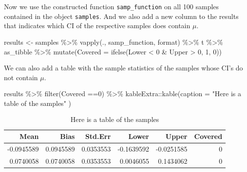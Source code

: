 \documentclass[
]{book}
\newenvironment{Shaded}{\begin{snugshade}}{\end{snugshade}}
\newcommand{\AttributeTok}[1]{\textcolor[rgb]{0.77,0.63,0.00}{#1}}
\newcommand{\DecValTok}[1]{\textcolor[rgb]{0.00,0.00,0.81}{#1}}
\newcommand{\FunctionTok}[1]{\textcolor[rgb]{0.00,0.00,0.00}{#1}}
\newcommand{\NormalTok}[1]{#1}
\newcommand{\OtherTok}[1]{\textcolor[rgb]{0.56,0.35,0.01}{#1}}
\newcommand{\SpecialCharTok}[1]{\textcolor[rgb]{0.00,0.00,0.00}{#1}}
\newcommand{\StringTok}[1]{\textcolor[rgb]{0.31,0.60,0.02}{#1}}
\begin{document}
Now we use the constructed function \texttt{samp\_function} on all 100 samples contained in the object \texttt{samples}. And we also add a new column to the results that indicates which CI of the respective samples does contain \(\mu\).

\begin{Shaded}
\begin{Highlighting}[]
\NormalTok{results }\OtherTok{\textless{}{-}}\NormalTok{ samples }\SpecialCharTok{\%\textgreater{}\%}
  \FunctionTok{vapply}\NormalTok{(., samp\_function, format) }\SpecialCharTok{\%\textgreater{}\%}
\NormalTok{  t }\SpecialCharTok{\%\textgreater{}\%}
\NormalTok{  as\_tibble }\SpecialCharTok{\%\textgreater{}\%} 
  \FunctionTok{mutate}\NormalTok{(}\AttributeTok{Covered =} \FunctionTok{ifelse}\NormalTok{(Lower }\SpecialCharTok{\textless{}} \DecValTok{0} \SpecialCharTok{\&}\NormalTok{ Upper }\SpecialCharTok{\textgreater{}} \DecValTok{0}\NormalTok{, }\DecValTok{1}\NormalTok{, }\DecValTok{0}\NormalTok{))}
\end{Highlighting}
\end{Shaded}

We can also add a table with the sample statistics of the samples whose CI's do not contain \(\mu\).

\begin{Shaded}
\begin{Highlighting}[]
\NormalTok{results }\SpecialCharTok{\%\textgreater{}\%}
  \FunctionTok{filter}\NormalTok{(Covered }\SpecialCharTok{==}\DecValTok{0}\NormalTok{) }\SpecialCharTok{\%\textgreater{}\%}
\NormalTok{  kableExtra}\SpecialCharTok{::}\FunctionTok{kable}\NormalTok{(}\AttributeTok{caption =} \StringTok{"Here is a table of the samples"}\NormalTok{ )}
\end{Highlighting}
\end{Shaded}

\begin{table}

\caption{\label{tab:unnamed-chunk-6}Here is a table of the samples}
\centering
\begin{tabular}[t]{r|r|r|r|r|r}
\hline
Mean & Bias & Std.Err & Lower & Upper & Covered\\
\hline
-0.0945589 & 0.0945589 & 0.0353553 & -0.1639592 & -0.0251585 & 0\\
\hline
0.0740058 & 0.0740058 & 0.0353553 & 0.0046055 & 0.1434062 & 0\\
\hline
\end{tabular}
\end{table}
\end{document}
